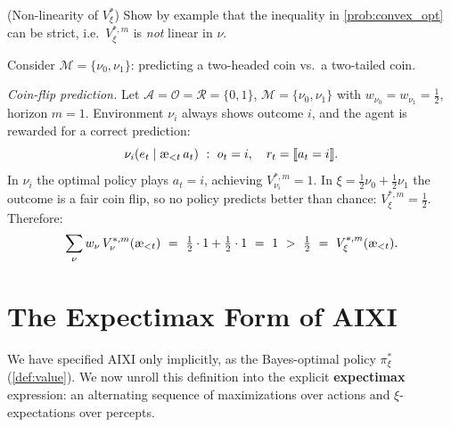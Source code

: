 \documentclass[fontsize=11pt, parskip=half]{scrartcl}
\newcommand{\cA}{\mathcal{A}}
\newcommand{\cO}{\mathcal{O}}
\newcommand{\cR}{\mathcal{R}}
\newcommand{\cM}{\mathcal{M}}
\newcommand{\aes}{\textnormal{\ae}}
\begin{document}
\begin{exercise}
\label{prob:nonlinear_opt}
\skippable
(Non-linearity of $V_\xi^*$)
Show by example that the inequality in \cref{prob:convex_opt} can be strict, i.e.\ $V_\xi^{*,m}$ is \emph{not} linear in $\nu$.


\begin{hint}
Consider $\cM = \{\nu_0, \nu_1\}$: predicting a two-headed coin vs.\ a two-tailed coin.
\end{hint}
\end{exercise}

\begin{solution}
\emph{Coin-flip prediction.}
Let $\cA = \cO = \cR = \{0,1\}$, $\cM = \{\nu_0, \nu_1\}$ with $w_{\nu_0} = w_{\nu_1} = \tfrac{1}{2}$, horizon $m = 1$.
Environment $\nu_i$ always shows outcome $i$, and the agent is rewarded for a correct prediction:
\[
    \nu_i(e_t \mid \aes_{<t}\, a_t) ~:~ o_t = i, \quad r_t = \llbracket a_t = i \rrbracket.
\]
In $\nu_i$ the optimal policy plays $a_t = i$, achieving $V_{\nu_i}^{*,m} = 1$.
In $\xi = \tfrac{1}{2}\nu_0 + \tfrac{1}{2}\nu_1$ the outcome is a fair coin flip, so no policy predicts better than chance: $V_\xi^{*,m} = \tfrac{1}{2}$.
Therefore:
\[
    \sum_\nu w_\nu\, V_\nu^{*,m}(\aes_{<t}) ~=~ \tfrac{1}{2} \cdot 1 + \tfrac{1}{2} \cdot 1 ~=~ 1 ~>~ \tfrac{1}{2} ~=~ V_\xi^{*,m}(\aes_{<t}).
\]
\end{solution}

\section{The Expectimax Form of AIXI}\label{prob:expectimax}

We have specified AIXI only implicitly, as the Bayes-optimal policy $\pi_\xi^*$ (\cref{def:value}).
We now unroll this definition into the explicit \textbf{expectimax} expression: an alternating sequence of maximizations over actions and $\xi$-expectations over percepts.
\end{document}
